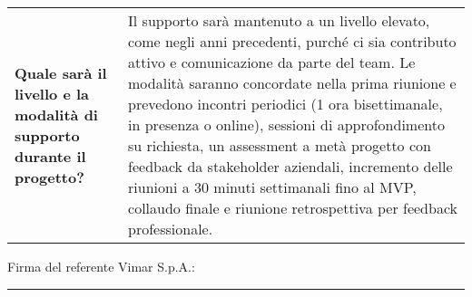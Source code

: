 \documentclass[a4paper,12pt]{article}
\begin{document}
\begin{longtable}{P{5cm}|P{10cm}}
\\
\textbf{Quale sarà il livello e la modalità di supporto durante il progetto?} & Il supporto sarà mantenuto a un livello elevato, come negli anni precedenti, purché ci sia contributo attivo e comunicazione da parte del team. Le modalità saranno concordate nella prima riunione e prevedono incontri periodici (1 ora bisettimanale, in presenza o online), sessioni di approfondimento su richiesta, un assessment a metà progetto con feedback da stakeholder aziendali, incremento delle riunioni a 30 minuti settimanali fino al MVP, collaudo finale e riunione retrospettiva per feedback professionale. \\

\end{longtable}
\vspace{3cm} %

\noindent
Firma del referente Vimar S.p.A.:\hspace{0.2cm} \rule{6cm}{0.4pt}
\end{document}
